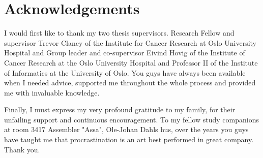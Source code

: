 \documentclass[a4paper,UKenglish]{ifimaster}
\begin{document}

\chapter*{Acknowledgements}
I would first like to thank my two thesis supervisors. Research Fellow and
supervisor Trevor Clancy of the Institute for Cancer Research at Oslo University
Hospital and Group leader and co-supervisor Eivind Hovig of the Institute of
Cancer Research at the Oslo University Hospital and Professor II of the
Institute of Informatics at the University of Oslo. You guys have always been
available when I needed advice, supported me throughout the whole process and
provided me with invaluable knowledge.

Finally, I must express my very profound gratitude to my family, for their
unfailing support and continuous encouragement. To my fellow study companions at
room 3417 Assembler "Assa", Ole-Johan Dahls hus, over the years you guys have
taught me that procrastination is an art best performed in great company. Thank
you.

\tableofcontents{}
\listoffigures{}
\listoftables{}
\lstlistoflistings
\printglossaries

\mainmatter{}





\backmatter{}
\printbibliography
\end{document}
